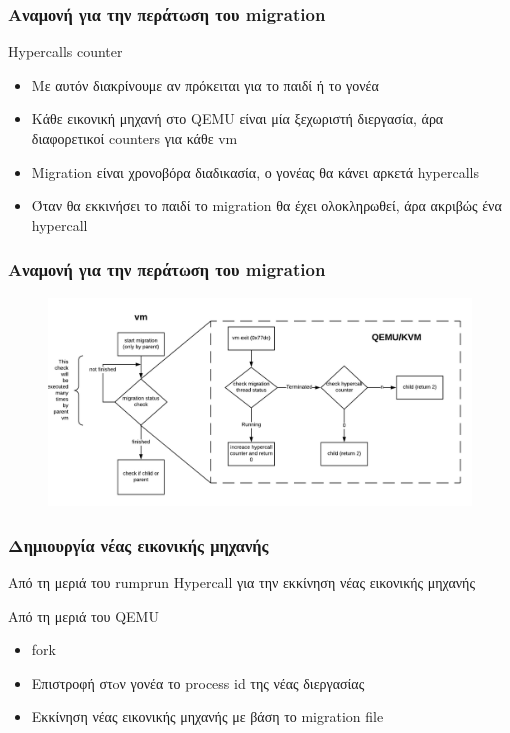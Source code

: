\documentclass[red,slidestop,notes,compress,mathserif]{beamer}
\begin{document}
\begin{frame}
\frametitle{Αναμονή για την περάτωση του migration}
\begin{block}{Hypercalls counter}
\begin{itemize}
\item Με αυτόν διακρίνουμε αν πρόκειται για το παιδί ή το γονέα
\item Κάθε εικονική μηχανή στο QEMU είναι μία ξεχωριστή διεργασία, άρα διαφορετικοί counters για κάθε vm
\item Migration είναι χρονοβόρα διαδικασία, ο γονέας θα κάνει αρκετά hypercalls
\item Όταν θα εκκινήσει το παιδί το migration θα έχει ολοκληρωθεί, άρα ακριβώς ένα hypercall
\end{itemize}
\end{block}
\end{frame}

\begin{frame}
\frametitle{Αναμονή για την περάτωση του migration}
\begin{figure}
\center
\includegraphics[scale=0.57]{figures/check_migration_status.png}
\end{figure}
\end{frame}

\begin{frame}
\frametitle{Δημιουργία νέας εικονικής μηχανής}
\begin{block}{Από τη μεριά του rumprun}
Hypercall για την εκκίνηση νέας εικονικής μηχανής
\end{block}
\begin{block}{Από τη μεριά του QEMU}
\begin{itemize}
\item fork 
\item Επιστροφή στoν γονέα το process id της νέας διεργασίας
\item Εκκίνηση νέας εικονικής μηχανής με βάση το migration file 
\end{itemize}
\end{block}
\end{frame}
\end{document}
